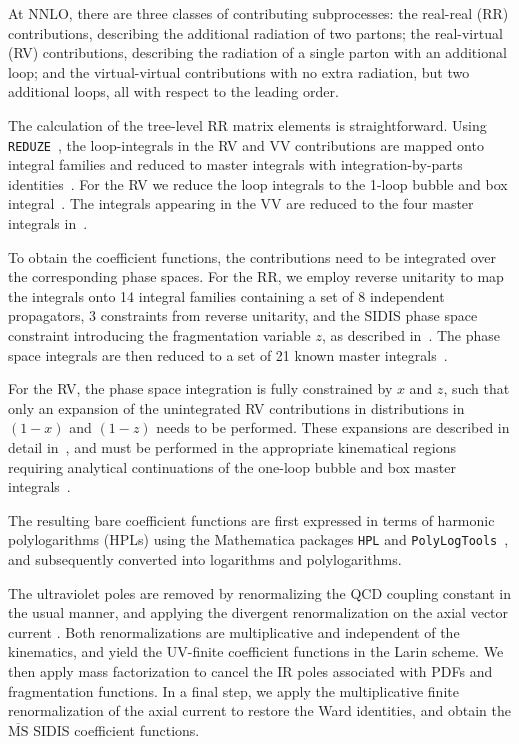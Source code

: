 \documentclass[11pt,a4paper]{article}
\newcommand{\MSbar}{\overline{\textrm{MS}}}
\begin{document}
At NNLO, there are three classes of contributing
subprocesses: the real-real (RR) contributions, describing the additional radiation of two partons; the real-virtual (RV) contributions, describing the radiation of a single parton with an additional loop; and the virtual-virtual contributions with no extra radiation, but two additional loops, all with respect to the leading order.

The calculation of the tree-level RR matrix elements is straightforward.
Using \texttt{REDUZE}~\cite{vonManteuffel:2012np}, the loop-integrals in the RV and VV contributions are mapped onto integral families and reduced to master integrals with integration-by-parts identities~\cite{Chetyrkin:1981qh,Laporta:2000dsw}.
For the RV we reduce the loop integrals to the 1-loop bubble and box integral~\cite{Gehrmann:1999as}.
The integrals appearing in the VV are reduced to the four master integrals in~\cite{Gehrmann:2005pd}.

To obtain the coefficient functions, the contributions need to be integrated over the corresponding phase spaces.
For the RR, we employ reverse unitarity \cite{Anastasiou:2002yz} to map the integrals onto 14 integral families containing a set of 8 independent propagators, 3 constraints from reverse unitarity, and the SIDIS phase space constraint introducing the fragmentation variable $z$, as described in~\cite{Bonino:2024adk}.
The phase space integrals are then reduced to a set of 21 known master
integrals~\cite{Bonino:2024adk,Ahmed:2024owh}.

For the RV, the phase space integration is fully constrained by $x$ and $z$, such that only an
expansion of the unintegrated RV contributions in distributions in $(1-x)$ and $(1-z)$ needs to be performed.
These expansions are described in detail in~\cite{Gehrmann:2022cih}, and
must be performed in the appropriate kinematical regions requiring analytical continuations of
the one-loop bubble and box master integrals~\cite{Gehrmann:2022cih,Haug:2022hkr}.

The resulting bare coefficient functions
 are first expressed in terms of harmonic polylogarithms (HPLs) \cite{Remiddi:1999ew,Gehrmann:2000zt} using the Mathematica packages \texttt{HPL} \cite{Maitre:2005uu} and \texttt{PolyLogTools}~\cite{Duhr:2019tlz}, and subsequently converted into logarithms and polylogarithms.

The ultraviolet poles are removed by renormalizing the QCD coupling constant in the usual manner, and applying the divergent renormalization on the axial vector current \cite{Larin:1993tq}.
Both renormalizations are multiplicative and independent of the kinematics, and yield the UV-finite coefficient functions in the Larin scheme.
We then apply mass factorization to cancel the IR poles associated with PDFs and fragmentation functions.
In a final step, we apply the multiplicative finite renormalization of the axial current \cite{Larin:1993tq} to restore the Ward identities, and obtain the $\MSbar$ SIDIS coefficient functions.
\end{document}
